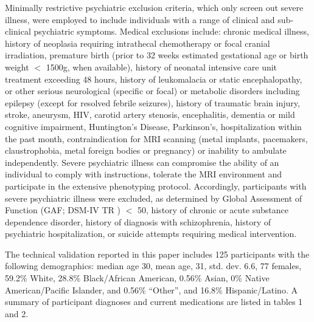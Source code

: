Minimally restrictive psychiatric exclusion criteria, which only screen out severe illness, were employed to include individuals with a range of clinical and sub-clinical psychiatric symptoms. Medical exclusions include: chronic medical illness, history of neoplasia requiring intrathecal chemotherapy or focal cranial irradiation, premature birth (prior to 32 weeks estimated gestational age or birth weight $<$ 1500g, when available), history of neonatal intensive care unit treatment exceeding 48 hours, history of leukomalacia or static encephalopathy, or other serious neurological (specific or focal) or metabolic disorders including epilepsy (except for resolved febrile seizures), history of traumatic brain injury, stroke, aneurysm, HIV, carotid artery stenosis, encephalitis, dementia or mild cognitive impairment, Huntington’s Disease, Parkinson’s, hospitalization within the past month, contraindication for MRI scanning (metal implants, pacemakers, claustrophobia, metal foreign bodies or pregnancy) or inability to ambulate independently. Severe psychiatric illness can compromise the ability of an individual to comply with instructions, tolerate the MRI environment and participate in the extensive phenotyping protocol. Accordingly, participants with severe psychiatric illness were excluded, as determined by Global Assessment of Function (GAF; DSM-IV TR \cite{First2002}) $<$ 50, history of chronic or acute substance dependence disorder, history of diagnosis with schizophrenia, history of psychiatric hospitalization, or suicide attempts requiring medical intervention.

The technical validation reported in this paper includes 125 participants with the following demographics: median age 30, mean age, 31, std. dev. 6.6, 77 females, 59.2\% White, 28.8\% Black/African American, 0.56\% Asian, 0\% Native American/Pacific Islander, and 0.56\% “Other”, and 16.8\% Hispanic/Latino. A summary of participant diagnoses and current medications are listed in tables 1 and 2.

